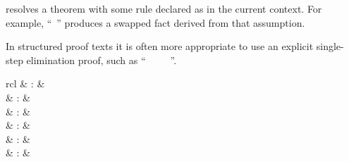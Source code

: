 \begin{isabellebody}
\begin{isamarkuptext}
\begin{descr}
  \item [\hyperlink{attribute.symmetric}{\mbox{\isa{symmetric}}}] resolves a theorem with some rule
  declared as \hyperlink{attribute.sym}{\mbox{}} in the current context.  For example,
  ``\hyperlink{command.assume}{\mbox{}}~'' produces a
  swapped fact derived from that assumption.

  In structured proof texts it is often more appropriate to use an
  explicit single-step elimination proof, such as ``\hyperlink{command.assume}{\mbox{}}~~\hyperlink{command.then}{\mbox{}}~\hyperlink{command.have}{\mbox{}}~~\hyperlink{command.ddot}{\mbox{\isa{\isacommand{{\isachardot}{\isachardot}}}}}''.

  \end{descr}%
\end{isamarkuptext}%
\isamarkuptrue%
%
\isamarkuptrue%
%
\isamarkuptrue%
%
\begin{isamarkuptext}%
\begin{matharray}{rcl}
    \hypertarget{command.case}{\hyperlink{command.case}{\mbox{}}} & : &  \\
    \hypertarget{command.print-cases}{\hyperlink{command.print-cases}{\mbox{}}}\isa{{\isachardoublequote}\isactrlsup {\isacharasterisk}{\isachardoublequote}} & : &  \\
    \hypertarget{attribute.case-names}{\hyperlink{attribute.case-names}{\mbox{}}} & : & \isaratt \\
    \hypertarget{attribute.case-conclusion}{\hyperlink{attribute.case-conclusion}{\mbox{}}} & : & \isaratt \\
    \hypertarget{attribute.params}{\hyperlink{attribute.params}{\mbox{}}} & : & \isaratt \\
    \hypertarget{attribute.consumes}{\hyperlink{attribute.consumes}{\mbox{}}} & : & \isaratt \\
  \end{matharray}


\end{isamarkuptext}
\end{isabellebody}
